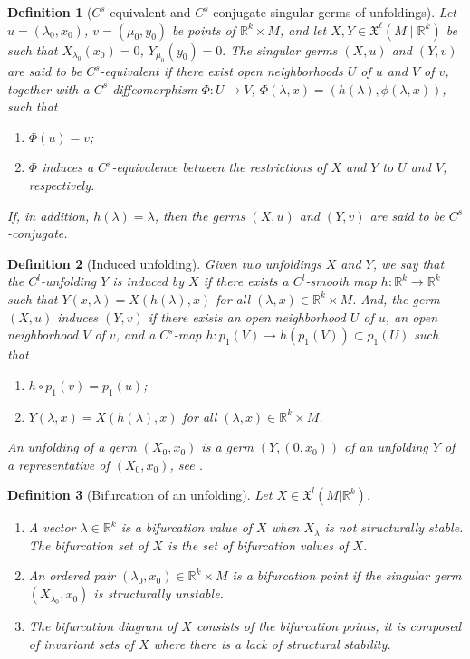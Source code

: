 \documentclass[12pt]{article}
\newtheorem{definition}{Definition}[section]
\newtheorem{remark definition}{Remark Definition}[section]
\begin{document}
	\begin{definition}[$C^s$-equivalent and $C^s$-conjugate singular germs of unfoldings]
		Let $u=(\lambda_0,x_0)$, $v=(\mu_0,y_0)$ be points of $\mathbb{R}^k\times M$, and let $X,Y\in \mathfrak{X}^{\ell}(M\mid \mathbb{R}^k)$ be such that $X_{\lambda_0}(x_0)=0$, $Y_{\mu_0}(y_0)=0.$
		The singular germs $(X,u)$ and $(Y,v)$ are said to be $C^s$-equivalent
		if there exist open neighborhoods $U$ of $u$ and $V$ of $v$, together with
		a $C^s$-diffeomorphism $\Phi:U\longrightarrow V$, 		$\Phi(\lambda,x)=(h(\lambda),\phi(\lambda,x))$,
		such that
		\begin{enumerate}
			\item $\Phi(u)=v$;
			\item $\Phi$ induces a $C^s$-equivalence between the restrictions of
			$X$ and $Y$ to $U$ and $V$, respectively.
		\end{enumerate}
		If, in addition, $h(\lambda)=\lambda$, then the germs $(X,u)$ and $(Y,v)$
		are said to be $C^s$-conjugate.
	\end{definition}
	
\begin{definition}[Induced unfolding]
Given two unfoldings $X$ and $Y$, we say that the $C^l$-unfolding $Y$ is induced by $X$ if there exists a $C^l$-smooth map $h: \mathbb{R}^k \to \mathbb{R}^k$ such that $Y(x, \lambda) = X(h(\lambda),x)$ for all $(\lambda,x) \in \mathbb{R}^k \times M$. And, the germ $(X,u)$ induces $(Y,v)$ if there exists an open neighborhood $U$ of $u$, an open neighborhood $V$ of $v$, and a $C^s$-map $h : p_1(V) \to h\left(p_1(V)\right)\subset p_1(U)$ such that  
\begin{enumerate}
	\item $h \circ p_1 (v) = p_1(u)$;
	\item $Y(\lambda, x) = X(h(\lambda), x)$ for all $(\lambda, x)\in \mathbb{R}^k \times M$.
\end{enumerate}
An unfolding of a germ $(X_0, x_0)$ is a germ $(Y, (0, x_0))$ of an unfolding $Y$ of a representative of $(X_0, x_0)$, see \cite{iv}.
\end{definition}

\begin{definition}[Bifurcation of an unfolding]
	Let $X\in \mathfrak{X}^l (M\vert \mathbb{R}^{k})$.
\begin{enumerate}
	\item[-] A vector $\lambda\in \mathbb{R}^k$ is a bifurcation value of $X$ when $X_\lambda$ is not structurally stable. The bifurcation set of $X$ is the set of bifurcation values of $X$.
	\item[-] An ordered pair  $(\lambda_0 , x_{0}) \in \mathbb{R}^k \times M$ is a bifurcation point if the singular germ $(X_{\lambda_0} , x_{0} )$ is structurally unstable.
	\item[-] The bifurcation diagram of $X$ consists of the bifurcation points, it is composed of invariant sets of $X$ where there is a lack of structural stability.
\end{enumerate}
\end{definition}
		
\end{document}
